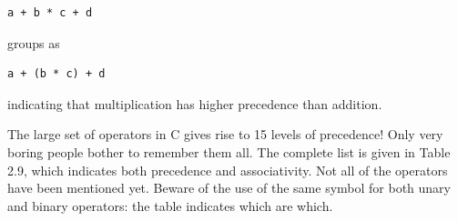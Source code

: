    \begin{Verbatim}
a + b * c + d
\end{Verbatim}

   groups as


   \begin{Verbatim}
a + (b * c) + d
\end{Verbatim}

   indicating that multiplication has higher precedence than addition.


   The large set of operators in C gives rise to 15 levels of
    precedence! Only very boring people bother to remember them all. The
    complete list is given in Table 2.9, which indicates both
    precedence and associativity. Not all of the operators have been mentioned
    yet. Beware of the use of the same symbol for both unary and binary
    operators: the table indicates which are which.


